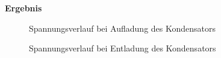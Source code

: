         
        
        
        \vspace{4mm}
        \textbf{Ergebnis}
        \newline
        \par
        \begin{figure}[H]
            \def\svgwidth{\textwidth}
            
            
            \caption{Spannungsverlauf bei Aufladung des Kondensators}
        \end{figure}
        \begin{figure}[H]
            \def\svgwidth{\textwidth}
            
            
            \caption{Spannungsverlauf bei Entladung des Kondensators}
        \end{figure}
        
        \clearpage
